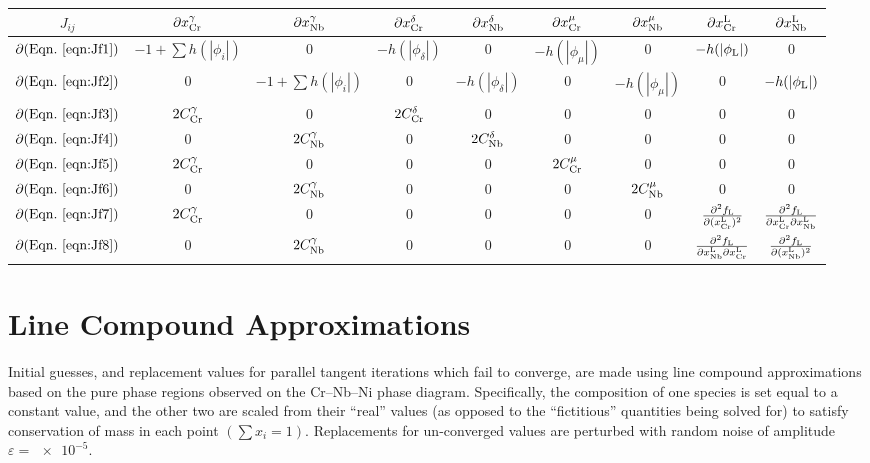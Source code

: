 \documentclass[10pt]{article}
\begin{document}
		\begin{table}[ht]\centering
		\begin{small}
		\begin{tabular}{|c|cccccccc|}\hline
		$J_{ij}$  & $\partial x_{\ce{Cr}}^{\gamma}$ & $\partial x_{\ce{Nb}}^{\gamma}$ & $\partial x_{\ce{Cr}}^{\delta}$ & $\partial x_{\ce{Nb}}^{\delta}$
		  & $\partial x_{\ce{Cr}}^{\mu}$ & $\partial x_{\ce{Nb}}^{\mu}$ & $\partial x_{\ce{Cr}}^{\ce{L}}$ & $\partial x_{\ce{Nb}}^{\ce{L}}$\\\hline
		$\partial (\mathrm{Eqn.}~{\ref{eqn:Jf1}})$ & $-1+\sum h(|\phi_i|)$ & 0 & $-h(|\phi_{\delta}|)$ & 0 & $-h(|\phi_{\mu}|)$ & 0 & $-h(|\phi_{\ce{L}}|)$ & 0\\
		$\partial (\mathrm{Eqn.}~{\ref{eqn:Jf2}})$ & 0 & $-1+\sum h(|\phi_i|)$ & 0 & $-h(|\phi_{\delta}|)$ & 0 & $-h(|\phi_{\mu}|)$ & 0 & $-h(|\phi_{\ce{L}}|)$\\
		$\partial (\mathrm{Eqn.}~{\ref{eqn:Jf3}})$ & $2C_{\ce{Cr}}^{\gamma}$ & $0$ 
		& $2C_{\ce{Cr}}^{\delta}$ & $0$ & 0 & 0 & 0 & 0\\
		$\partial (\mathrm{Eqn.}~{\ref{eqn:Jf4}})$ & $0$ & $2C_{\ce{Nb}}^{\gamma}$
		& $0$ & $2C_{\ce{Nb}}^{\delta}$ & 0 & 0 & 0 & 0\\
		$\partial (\mathrm{Eqn.}~{\ref{eqn:Jf5}})$ & $2C_{\ce{Cr}}^{\gamma}$ & $0$ 
		& 0 & 0 & $2C_{\ce{Cr}}^{\mu}$ & $0$	& 0 & 0\\
		$\partial (\mathrm{Eqn.}~{\ref{eqn:Jf6}})$ & $0$ & $2C_{\ce{Nb}}^{\gamma}$
		& 0 & 0 & $0$ & $2C_{\ce{Nb}}^{\mu}$	& 0 & 0\\
		$\partial (\mathrm{Eqn.}~{\ref{eqn:Jf7}})$ & $2C_{\ce{Cr}}^{\gamma}$ & $0$ 
		& 0 & 0 & 0 & 0 & $\frac{\partial^2 f_{\ce{L}}}{\partial(x_{\ce{Cr}}^{\ce{L}})^2}$ & $\frac{\partial^2 f_{\ce{L}}}{\partial x_{\ce{Cr}}^{\ce{L}}\partial x_{\ce{Nb}}^{\ce{L}}}$
		\\
		$\partial (\mathrm{Eqn.}~{\ref{eqn:Jf8}})$ & $0$ & $2C_{\ce{Nb}}^{\gamma}$
		& 0 & 0 & 0 & 0 & $\frac{\partial^2 f_{\ce{L}}}{\partial x_{\ce{Nb}}^{\ce{L}} \partial x_{\ce{Cr}}^{\ce{L}}}$ & $\frac{\partial^2 f_{\ce{L}}}{\partial(x_{\ce{Nb}}^{\ce{L}})^2}$
		\\\hline
		\end{tabular}
		\end{small}
		\end{table}


	\section{Line Compound Approximations}\label{app:linecomp}
		Initial guesses, and replacement values for parallel tangent iterations which fail to converge,
		are made using line compound approximations based on the pure phase regions observed on the Cr--Nb--Ni phase diagram.
		Specifically, the composition of one species is set equal to a constant value,
		and the other two are scaled from their ``real'' values (as opposed to the ``fictitious'' quantities being solved for)
		to satisfy conservation of mass in each point $\left(\sum x_i=1\right)$.
		Replacements for un-converged values are perturbed with random noise of amplitude $\varepsilon=\num{e-5}$.
		
\end{document}
